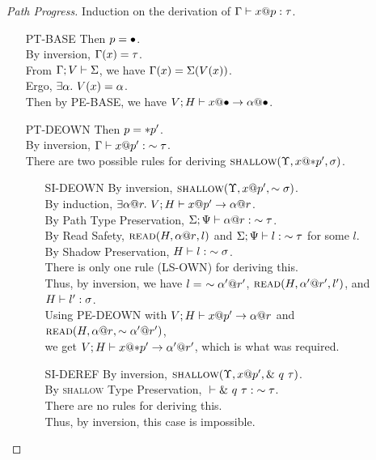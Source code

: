 \begin{proof}[Path Progress]
  Induction on the derivation of ${\Gamma} \vdash {{x}@{p}} : {\tau}$.
  \begin{itemize}
    \item[PT-BASE] 
      Then $p = \bullet$.\\
      By inversion, $\Gamma(x)=\tau$.\\
      From $\Gamma;V\vdash\Sigma$, we have $\Gamma(x)=\Sigma(V(x))$.\\
      Ergo, $\exists \alpha.~V(x)=\alpha$.\\
      Then by \textsc{PE-BASE}, we have ${V;H} \vdash {{x}@{\bullet}} \to {{\alpha}@{\bullet}}$.
    \item[PT-DEOWN] 
      Then $p = *{p'}$.\\
      By inversion, ${\Gamma} \vdash {{x}@{p'}} : {\sim{\tau}}$.\\
      There are two possible rules for deriving $\textsc{shallow}({\Upsilon},{{x}@{*{p'}}},{\sigma})$.
      \begin{itemize}
	\item[\textsc{SI-DEOWN}]
	  By inversion, $\textsc{shallow}({\Upsilon},{{x}@{p'}},{\sim{\sigma}})$.\\
	  By induction, $\exists {\alpha}@{r}.~{V;H} \vdash {{x}@{p'}} \to {{\alpha}@{r}}$.\\
	  By Path Type Preservation, ${\Sigma;\Psi} \vdash {{\alpha}@{r}} : {\sim{\tau}}$.\\
	  By Read Safety, $\textsc{read}({H},{{\alpha}@{r}},{l})$ 
	  and ${\Sigma;\Psi} \vdash {l} : {\sim{\tau}}$ for some $l$.\\
	  By Shadow Preservation, ${H} \vdash {l} : {\sim{\sigma}}$.\\
	  There is only one rule (\textsc{LS-OWN}) for deriving this.\\
	  Thus, by inversion, we have $l =\ \own{\addr{\ga'}{r'}}$,
	  $\textsc{read}({H},{{\alpha'}@{r'}},{l'})$, and ${H} \vdash {l'} : {\sigma}$.\\
	  Using \textsc{PE-DEOWN} with
	  ${V;H} \vdash {{x}@{p'}} \to {{\alpha}@{r}}$ and
	  $\textsc{read}({H},{{\alpha}@{r}},{\sim{{\alpha'}@{r'}}})$, \\ 
	  we get ${V;H} \vdash {{x}@{*{p'}}} \to {{\alpha'}@{r'}}$,
	  which is what was required.
	\item[\textsc{SI-DEREF}]
	  By inversion, $\textsc{shallow}({\Upsilon},{{x}@{p'}},{\&~{{q}~{\tau}}})$.\\
	  By \textsc{shallow} Type Preservation, ${} \vdash {\&~{{q}~{\tau}}} : {\sim{\tau}}$.\\
	  There are no rules for deriving this.\\
	  Thus, by inversion, this case is impossible.
      \end{itemize}


\end{itemize}
\end{proof}
